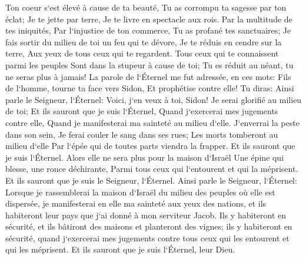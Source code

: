 \verse Ton coeur s`est élevé à cause de ta beauté, Tu as corrompu ta sagesse par ton éclat; Je te jette par terre, Je te livre en spectacle aux rois. 
\verse Par la multitude de tes iniquités, Par l`injustice de ton commerce, Tu as profané tes sanctuaires; Je fais sortir du milieu de toi un feu qui te dévore, Je te réduis en cendre sur la terre, Aux yeux de tous ceux qui te regardent. 
\verse Tous ceux qui te connaissent parmi les peuples Sont dans la stupeur à cause de toi; Tu es réduit au néant, tu ne seras plus à jamais! 
\verse La parole de l`Éternel me fut adressée, en ces mots: 
\verse Fils de l`homme, tourne ta face vers Sidon, Et prophétise contre elle! 
\verse Tu diras: Ainsi parle le Seigneur, l`Éternel: Voici, j`en veux à toi, Sidon! Je serai glorifié au milieu de toi; Et ils sauront que je suis l`Éternel, Quand j`exercerai mes jugements contre elle, Quand je manifesterai ma sainteté au milieu d`elle. 
\verse J`enverrai la peste dans son sein, Je ferai couler le sang dans ses rues; Les morts tomberont au milieu d`elle Par l`épée qui de toutes parts viendra la frapper. Et ils sauront que je suis l`Éternel. 
\verse Alors elle ne sera plus pour la maison d`Israël Une épine qui blesse, une ronce déchirante, Parmi tous ceux qui l`entourent et qui la méprisent. Et ils sauront que je suis le Seigneur, l`Éternel. 
\verse Ainsi parle le Seigneur, l`Éternel: Lorsque je rassemblerai la maison d`Israël du milieu des peuples où elle est dispersée, je manifesterai en elle ma sainteté aux yeux des nations, et ils habiteront leur pays que j`ai donné à mon serviteur Jacob. 
\verse Ils y habiteront en sécurité, et ils bâtiront des maisons et planteront des vignes; ils y habiteront en sécurité, quand j`exercerai mes jugements contre tous ceux qui les entourent et qui les méprisent. Et ils sauront que je suis l`Éternel, leur Dieu. 

\chapter{}


